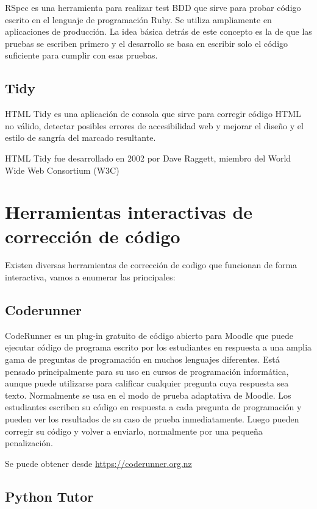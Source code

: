 RSpec es una herramienta para realizar test BDD que sirve para probar código escrito en el lenguaje de programación Ruby. Se utiliza ampliamente en aplicaciones de producción. La idea básica detrás de este concepto es la de que las pruebas se escriben primero y el desarrollo se basa en escribir solo el código suficiente para cumplir con esas pruebas.

\subsection {Tidy}

HTML Tidy es una aplicación de consola que sirve para corregir código HTML no válido, detectar posibles errores de accesibilidad web y mejorar el diseño y el estilo de sangría del marcado resultante.

HTML Tidy fue desarrollado en 2002 por Dave Raggett, miembro del World Wide Web Consortium (W3C)

\section {Herramientas interactivas de corrección de código}

Existen diversas herramientas de corrección de codigo que funcionan de forma interactiva, vamos a enumerar las principales:

\subsection {Coderunner}

CodeRunner es un plug-in gratuito de código abierto para Moodle que puede ejecutar código de programa escrito por los estudiantes en respuesta a una amplia gama de preguntas de programación en muchos lenguajes diferentes. Está pensado principalmente para su uso en cursos de programación informática, aunque puede utilizarse para calificar cualquier pregunta cuya respuesta sea texto. Normalmente se usa en el modo de prueba adaptativa de Moodle. Los estudiantes escriben su código en respuesta a cada pregunta de programación y pueden ver los resultados de su caso de prueba inmediatamente. Luego pueden corregir su código y volver a enviarlo, normalmente por una pequeña penalización.

Se puede obtener desde \url{https://coderunner.org.nz}

\subsection {Python Tutor}

